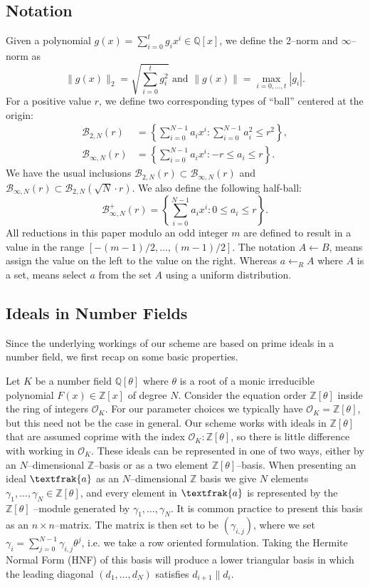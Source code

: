 \documentclass[a4paper, 12pt]{article}
\newcommand{\ndash}{\nobreakdash --}
\newcommand{\bb}[1]{\mathbb{#1}}
\newcommand{\mc}[1]{\mathcal{#1}}
\newcommand{\tfr}[1]{\textfrak{#1}}
\begin{document}
	\subsection{Notation}
	
	Given a polynomial $g(x)=\sum_{i=0}^{t}{g_i x^i} \in \bb{Q}[x]$, we define the 2\ndash norm and $\infty$\ndash norm as
	\[
	\|g(x)\|_2 = \sqrt{\sum_{i=0}^{t}{g_i^2}} \text{ and } \|g(x)\|=\max_{i=0, \dots, t} |g_i|.
	\] %
	For a positive value $r$, we define two corresponding types of “ball” centered at the origin:
	\begin{align*}
	\mc{B}_{2,N}(r)&=\left\{ \sum_{i=0}^{N-1}{a_i x^i} : \sum_{i=0}^{N-1}{a_i^2 \le r^2} \right\},\\
	\mc{B}_{\infty,N}(r)&=\left\{ \sum_{i=0}^{N-1}{a_i x^i} : {-r \le a_i \le r} \right\}.
	\end{align*}
	We have the usual inclusions $\mc{B}_{2,N}(r) \subset \mc{B}_{\infty,N}(r)$ and $\mc{B}_{\infty,N}(r) \subset \mc{B}_{2,N}(\sqrt{N} \cdot r)$.
	We also define the following half-ball:
	\[
	\mc{B}_{\infty,N}^{+}(r)=\left\{ \sum_{i=0}^{N-1}{a_i x^i} : {0 \le a_i \le r} \right\}.
	\] %
	All reductions in this paper modulo an odd integer $m$ are defined to result in a value in the range $[-(m - 1)/2,\ldots, (m - 1)/2]$. 
	The notation $A\leftarrow B$, means assign the value on the left to the value on the right. Whereas $a \leftarrow _R A$ where $A$ is a set, means select $a$ from the set $A$ using a uniform distribution.
	
	\subsection{Ideals in Number Fields}
	
	Since the underlying workings of our scheme are based on prime ideals in a number field, we first recap on some basic properties.
	
	Let $K$ be a number field $\bb{Q}[\theta]$ where $\theta$ is a root of a monic irreducible polynomial $F(x) \in \bb{Z}[x]$ of degree $N$.
	Consider the equation order $\bb{Z}[\theta]$ inside the ring of integers $\mc{O}_K$.
	For our parameter choices we typically have $\mc{O}_K = \bb{Z}[\theta]$, but this need not be the case in general.
	Our scheme works with ideals in $\bb{Z}[\theta]$ that are assumed coprime with the index $\mc{O}_K: \bb{Z}[\theta]$, so there is little difference with working in $\mc{O}_K$.
	These ideals can be represented in one of two ways, either by an $N$\ndash dimensional $\bb{Z}$\ndash basis or as a two element $\bb{Z}[\theta]$\ndash basis.
	When presenting an ideal $\tfr{a}$ as an $N$\ndash dimensional $\bb{Z}$ basis we give $N$ elements $\gamma_1, \ldots, \gamma_N \in \bb{Z}[\theta]$, and every element in $\tfr{a}$ is represented by the $\bb{Z}[\theta]$ \ndash module generated by $\gamma_1, \ldots, \gamma_N$.
	It is common practice to present this basis as an $n \times n$\ndash matrix.
	The matrix is then set to be $(\gamma_{i,j})$, where we set $\gamma_i = \sum_{j=0}^{N - 1}{\gamma_{i,j}\theta^j}$, i.e. we take a row oriented formulation. 
	Taking the Hermite Normal Form (HNF) of this basis will
	produce a lower triangular basis in which the leading diagonal $(d_1,\ldots ,d_N)$ satisfies $d_{i+1}\|d_i$.
	
\end{document}

